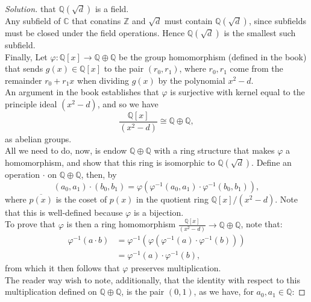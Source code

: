\documentclass[12pt]{article}
\newenvironment{solution}
  {\renewcommand\qedsymbol{$\blacksquare$}\begin{proof}[Solution]}
{\end{proof}}
\theoremstyle{remark}
\begin{document}
\begin{solution}
  that $\mathbb{Q}(\sqrt{d})$ is a field.\\
  \indent Any subfield of $\mathbb{C}$ that conatins $\mathbb{Z}$ and 
  $\sqrt{d}$ must contain $\mathbb{Q}(\sqrt{d})$, since subfields
  must be closed under the field operations.
  Hence $\mathbb{Q}(\sqrt{d})$ is the smallest such subfield. \\
  \indent Finally, Let 
  $\varphi : \mathbb{Q}[x]\to \mathbb{Q}\oplus\mathbb{Q}$
  be the group homomorphism (defined in the book) that sends
  $g(x)\in\mathbb{Q}[x]$ to the pair $(r_0,r_1)$, where $r_0,r_1$
  come from the remainder $r_0+r_1x$ when dividing $g(x)$
  by the polynomial $x^2-d$. \\
  \indent An argument in the book establishes that $\varphi$ is surjective
  with kernel equal to the principle ideal $(x^2-d)$, and so we have
  \begin{equation*}
    \frac{\mathbb{Q}[x]}{(x^2-d)}\cong \mathbb{Q}\oplus\mathbb{Q},
  \end{equation*}
  as abelian groups.\\
  \indent All we need to do, now, is endow $\mathbb{Q}\oplus\mathbb{Q}$
  with a ring structure that makes $\varphi$ a homomorphism, and show
  that this ring is isomorphic to $\mathbb{Q}(\sqrt{d})$.
  Define an operation $\cdot$ on $\mathbb{Q}\oplus\mathbb{Q}$, then,
  by 
  \begin{equation*}
    (a_0,a_1)\cdot(b_0,b_1) = 
    \varphi\left(\varphi^{-1}\left(a_0,a_1\right)
    \cdot\varphi^{-1}\left(b_0,b_1\right)\right),
  \end{equation*}
  where $\overline{p(x)}$ is the coset of $p(x)$ in the quotient ring
  $\mathbb{Q}[x]/(x^2-d)$. 
  Note that this is well-defined because $\varphi$ is a bijection.\\
  \indent To prove that $\varphi$ is then a ring homomorphism
  $\displaystyle\frac{\mathbb{Q}[x]}{(x^2-d)}\to \mathbb{Q}\oplus\mathbb{Q}$,
  note that:
  \begin{align*}
    \varphi^{-1}(a\cdot b) 
    &= \varphi^{-1}
      \left( \varphi(\varphi^{-1}(a)\cdot\varphi^{-1}(b) )\right) \\
      &= \varphi^{-1}(a)\cdot\varphi^{-1}(b),
  \end{align*}
  from which it then follows that $\varphi$ preserves multiplication. \\
  \indent The reader way wish to note, additionally, that the
  identity with respect to this multiplication defined on
  $\mathbb{Q}\oplus\mathbb{Q}$, is the pair $(0,1)$, as we have,
  for $a_0,a_1\in\mathbb{Q}$:

\end{solution}
\end{document}
